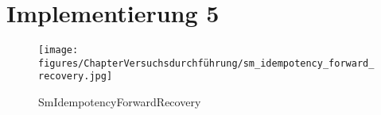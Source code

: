 \section{Implementierung 5}

\begin{figure}[h!]
	\centering
	\texttt{[image: figures/ChapterVersuchsdurchführung/sm\_idempotency\_forward\_recovery.jpg]}
	\caption{SmIdempotencyForwardRecovery}
\end{figure}
\FloatBarrier
